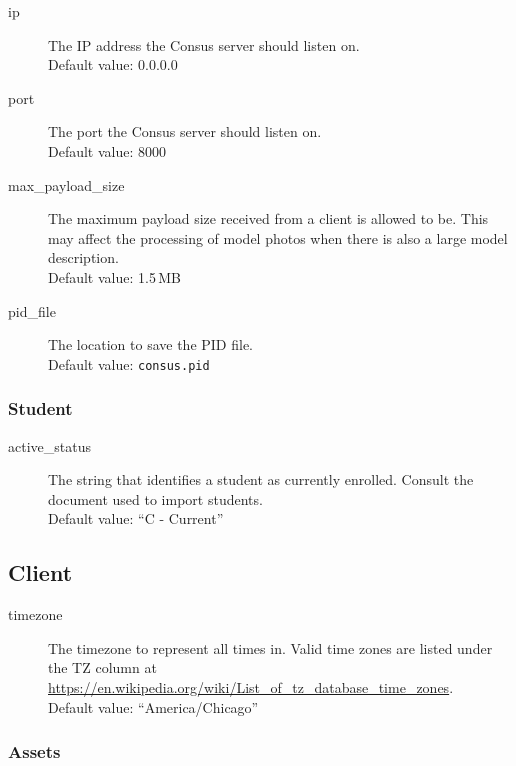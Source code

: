 \begin{description}
  \item[ip] The IP address the Consus server should listen on.\\
    Default value: 0.0.0.0
  \item[port] The port the Consus server should listen on.\\
    Default value: 8000
  \item[max\_payload\_size] The maximum payload size received from a client is allowed to be.
    This may affect the processing of model photos when there is also a large model description.\\
    Default value: 1.5\,MB
  \item[pid\_file] The location to save the PID file.\\
    Default value: \texttt{consus.pid}
\end{description}

\subsubsection{Student}
\label{subsubsec:server_config_student}

\begin{description}
  \item[active\_status] The string that identifies a student as currently enrolled.
    Consult the document used to import students.\\
    Default value: ``C - Current''
\end{description}

\subsection{Client}
\label{subsec:client_config}

\begin{description}
  \item[timezone] The timezone to represent all times in.
    Valid time zones are listed under the TZ column at \url{https://en.wikipedia.org/wiki/List_of_tz_database_time_zones}.\\
    Default value: ``America/Chicago''
\end{description}

\subsubsection{Assets}
\label{subsubsec:client_config_assets}

